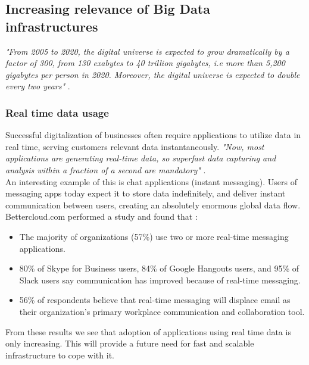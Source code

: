 \documentclass[a4paper,english]{report}
\begin{document}
			\subsection{Increasing relevance of Big Data infrastructures}
			\label{big_data}
			\textit{"From 2005 to 2020, the digital universe is expected to grow dramatically by a factor of 300, from 130 exabytes to 40 trillion gigabytes, i.e more than 5,200 gigabytes per person in 2020. Moreover, the digital universe is expected to double every two years"} \cite{bigdata}.
				\subsubsection{Real time data usage}
				Successful digitalization of businesses often require applications to utilize data in real time, serving customers relevant data instantaneously. \textit{"Now, most applications are generating real-time data, so superfast data capturing and analysis within a fraction of a second are mandatory"} \cite{management_analytics}.
				\\
				An interesting example of this is chat applications (instant messaging). Users of messaging apps today expect it to store data indefinitely, and deliver instant communication between users, creating an absolutely enormous global data flow. Bettercloud.com performed a study and found that \cite{bettercloud}:
				\begin{itemize}
					\item The majority of organizations (57\%) use two or more real-time messaging applications.
					\item 80\% of Skype for Business users, 84\% of Google Hangouts users, and 95\% of Slack users say communication has improved because of real-time messaging.
					\item 56\% of respondents believe that real-time messaging will displace email as their organization’s primary workplace communication and collaboration tool.
				\end{itemize}
				From these results we see that adoption of applications using real time data is only increasing. This will provide a future need for fast and scalable infrastructure to cope with it. 
\end{document}
